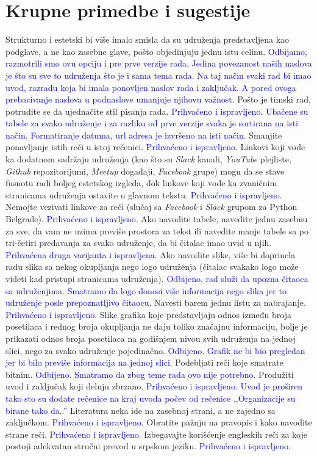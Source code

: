 \documentclass[a4paper]{report}
\newcommand{\odgovor}[1]{\textcolor{blue}{#1}}
\begin{document}
\section{Krupne primedbe i sugestije}
Strukturno i estetski bi više imalo smisla da su udruženja predstavljena kao podglave, 
a ne kao zasebne glave, pošto objedinjuju jednu istu celinu.
\odgovor{Odbijamo, razmotrili smo ovu opciju i pre prve verzije rada. Jedina povezanost naših naslova je što su sve to udruženja što je i sama tema rada. Na taj način svaki rad bi imao uvod, razradu koja bi imala ponovljen naslov rada i zaključak. A pored ovoga prebacivanje naslova u podnaslove umanjuje njihovu važnost.}
Pošto je timski rad, potrudite se da ujednačite stil pisanja rada.
\odgovor{Prihvaćeno i ispravljeno. Ubačene su tabele za svako udruženje i za razliku od prve verzije svaka je sortirana na isti način. Formatiranje datuma, url adresa je izvršeno na isti način.}
Smanjite ponavljanje istih reči u istoj rečenici.
\odgovor{Prihvaćeno i ispravljeno.}
Linkovi koji vode ka dodatnom sadržaju udruženja (kao što su \textit{Slack} kanali, \textit{YouTube} plejliste, \textit{Github} repozitorijumi, 
\textit{Meetup} događaji, \textit{Facebook} grupe) mogu da se stave fusnotu radi boljeg estetskog izgleda, dok
linkove koji vode ka zvaničnim stranicama udruženja ostavite u glavnom tekstu. 
\odgovor{Prihvaćeno i ispravljeno.}
Nemojte vezivati linkove za reči (slučaj sa \textit{Facebook} i \textit{Slack} grupom za Python Belgrade). 
\odgovor{Prihvaćeno i ispravljeno.}
Ako navodite tabele, navedite jednu zasebnu za sve, da vam ne uzima previše prostora za tekst ili
navedite manje tabele sa po tri-četiri predavanja za svako udruženje, da bi čitalac imao uvid u njih.
\odgovor{Prihvaćena druga varijanta i ispravljena.}
Ako navodite slike, više bi doprinela radu slika sa nekog okupljanja nego logo 
udruženja (čitalac svakako logo može videti kad pristupi stranicama udruženja).
\odgovor{Odbijeno, rad služi da upozna čitaoca sa udruženjima. Smatramo da logo donosi više informacija nego slika jer to udruženje posle prepoznatljivo čitaocu.}
Navesti barem jednu listu za nabrajanje.
\odgovor{Prihvaćeno i ispravljeno.}
Slike grafika koje predstavljaju odnos između broja posetilaca
i rednog broja okupljanja ne daju toliko značajnu informaciju, bolje je prikazati odnos broja posetilaca na
godišnjem nivou svih udruženja na jednoj slici, nego za svako udruženje pojedinačno.
\odgovor{Odbijeno. Grafik ne bi bio pregledan jer bi bilo previše informacija na jednoj slici.}
Podebljati reči koje smatrate bitnim. \odgovor{Odbijeno. Smatramo da zbog teme rada ovo nije potrebno.}
Produžiti uvod i zaključak koji deluju zbrzano.  \odgovor{Prihvaćeno i ispravljeno. Uvod je proširen tako sto su dodate rečenice na kraj uvoda počev od rečenice ,,Organizacije su birane tako da..''}
Literatura neka ide na zasebnoj strani, a ne zajedno sa zaključkom. \odgovor{Prihvaćeno i ispravljeno.}
Obratite pažnju na pravopis i kako navodite strane reči. \odgovor{Prihvaćeno i ispravljeno.}
Izbegavajte korišćenje engleskih reči za koje postoji adekvatan stručni prevod u srpskom jeziku. \odgovor{Prihvaćeno i ispravljeno.}
\end{document}
